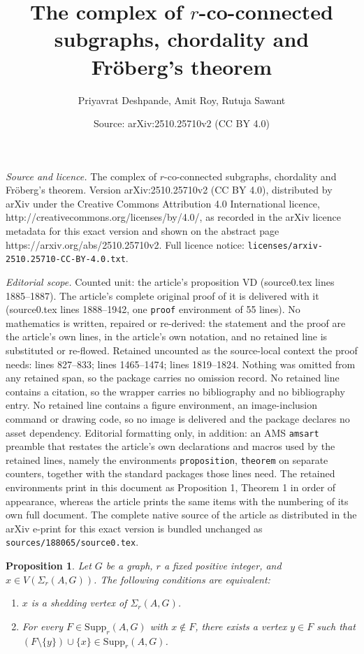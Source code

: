\documentclass[10pt,a4paper]{amsart}
\title{The complex of $r$-co-connected subgraphs, chordality and Fr\"oberg's theorem}
\author{Priyavrat Deshpande, Amit Roy, Rutuja Sawant}
\date{Source: arXiv:2510.25710v2 (CC BY 4.0)}
\newtheorem{proposition}{Proposition}
\newcommand{\Supp}{\mathrm{Supp}}
\begin{document}
\maketitle

\noindent\emph{Source and licence.} The complex of $r$-co-connected subgraphs, chordality and Fr\"oberg's theorem. Version arXiv:2510.25710v2 (CC BY 4.0), distributed by arXiv under the Creative Commons Attribution 4.0 International licence, http://creativecommons.org/licenses/by/4.0/, as recorded in the arXiv licence metadata for this exact version and shown on the abstract page https://arxiv.org/abs/2510.25710v2. Full licence notice: \texttt{licenses/arxiv-2510.25710-CC-BY-4.0.txt}.\par\smallskip

\noindent\textit{Editorial scope.} Counted unit: the article's proposition VD (source0.tex lines 1885--1887). The article's complete original proof of it is delivered with it (source0.tex lines 1888--1942, one \texttt{proof} environment of 55 lines). No mathematics is written, repaired or re-derived: the statement and the proof are the article's own lines, in the article's own notation, and no retained line is substituted or re-flowed.  Retained uncounted as the source-local context the proof needs: lines 827--833; lines 1465--1474; lines 1819--1824.  Nothing was omitted from any retained span, so the package carries no omission record.  No retained line contains a citation, so the wrapper carries no bibliography and no bibliography entry.  No retained line contains a figure environment, an image-inclusion command or drawing code, so no image is delivered and the package declares no asset dependency.  Editorial formatting only, in addition: an AMS \texttt{amsart} preamble that restates the article's own declarations and macros used by the retained lines, namely the environments \texttt{proposition}, \texttt{theorem} on separate counters, together with the standard packages those lines need.  The retained environments print in this document as Proposition 1, Theorem 1 in order of appearance, whereas the article prints the same items with the numbering of its own full document.  The complete native source of the article as distributed in the arXiv e-print for this exact version is bundled unchanged as \texttt{sources/188065/source0.tex}.
\begin{proposition}\label{Eq. Condition for a shedding vertex}
Let $G$ be a graph, $r$ a fixed positive integer, and $x \in V(\Sigma_r(A,G))$. The following conditions are equivalent:
\begin{enumerate}
	\item[(i)] $x$ is a shedding vertex of $\Sigma_r(A,G)$.		
	\item[(ii)] For every $F \in \Supp_r(A,G)$ with $x \notin F$, there exists a vertex $y \in F$ such that $(F \setminus \{y\}) \cup \{x\} \in \mathrm{Supp}_r(A,G)$.
\end{enumerate}
\end{proposition}
\end{document}
